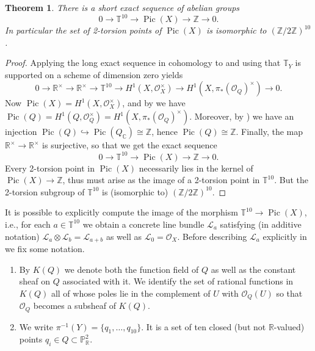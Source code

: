 \documentclass[a4paper,10pt]{amsart}
\theoremstyle{definition}
\theoremstyle{plain}
\newtheorem{thm}[Def]{Theorem}
\newcommand{\Pic}{\operatorname{Pic}}
\newcommand{\cL}{{\mathcal L}}
\newcommand{\cO}{{\mathcal O}}
\newcommand{\C}{{\mathbb C}}
\newcommand{\R}{{\mathbb R}}
\newcommand{\pp}{\mathbb{P}}
\newcommand{\Z}{{\mathbb Z}}
\begin{document}
\begin{thm}\label{thm:picrob}
 There is a short exact sequence of abelian groups
 \begin{equation*}
     0 \to \mathbb{T}^{10} \to \Pic(X) \to \Z \to 0.
 \end{equation*}
 In particular the set of 2-torsion points of $\Pic(X)$ is isomorphic to $(\Z/2\Z)^{10}$.
\end{thm}

\begin{proof}
 Applying the long exact sequence in cohomology to  and using that $\mathbb{T}_Y$ is supported on a scheme of dimension zero yields
 \begin{equation*}
     0 \to \R^\times \to \R^\times \to \mathbb{T}^{10} \to H^1(X, \cO_X^\times) \to H^1(X, \pi_*(\cO_Q)^\times) \to 0.
 \end{equation*}
 Now $\Pic(X)=H^1(X, \cO_X^\times)$, and by \cite[Corollaire 21.8.2]{EGAIV4} we have $\Pic(Q) = H^1(Q, \cO_Q^\times) = H^1(X, \pi_*(\cO_Q)^\times)$. Moreover, by \cite[Tag 0CDY]{stacks-project}) we have an injection $\Pic(Q) \hookrightarrow \Pic(Q_\C) \cong \Z$, hence $\Pic(Q) \cong \Z$. Finally, the map $\R^\times \to \R^\times$ is surjective, so that we get the exact sequence
 \begin{equation*}
     0 \to \mathbb{T}^{10} \to \Pic(X) \to \Z \to 0.
 \end{equation*}
 Every 2-torsion point in $\Pic(X)$ necessarily lies in the kernel of $\Pic(X) \to \Z$, thus must arise as the image of a 2-torsion point in $\mathbb{T}^{10}$. But the 2-torsion subgroup of $\mathbb{T}^{10}$ is (isomorphic to) $(\Z/2\Z)^{10}$.
\end{proof}

It is possible to explicitly compute the image of the morphism $\mathbb{T}^{10} \to \Pic(X)$, i.e., for each $a \in \mathbb{T}^{10}$ we obtain a concrete line bundle $\cL_a$ satisfying (in additive notation) $\cL_a \otimes \cL_b = \cL_{a+b}$ as well as $\cL_0 = \cO_X$. Before describing $\cL_a$ explicitly in  we fix some notation.

\begin{enumerate}
    \item By $K(Q)$ we denote both the function field of $Q$ as well as the constant sheaf on $Q$ associated with it. We identify the set of rational functions in $K(Q)$ all of whose poles lie in the complement of $U$ with $\cO_Q(U)$ so that $\cO_Q$ becomes a subsheaf of $K(Q)$. 

    \item We write $\pi^{-1}(Y) = \{ q_1, \dots, q_{10} \}$. It is a set of ten closed (but not $\R$-valued) points $q_i \in Q\subset \pp^2_\R$.
\end{enumerate}
\end{document}
